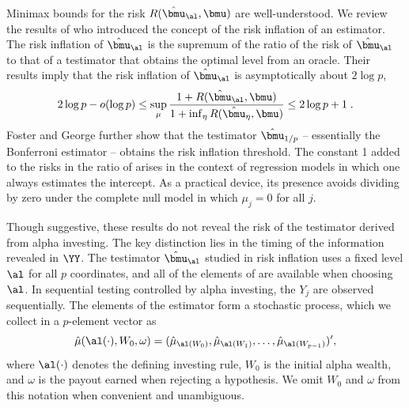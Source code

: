 \documentclass[12pt]{article}
\begin{document}
 Minimax bounds for the risk $R(\hat{\bmu}_\al,\bmu)$ are well-understood.  We
 review the results of \citet{fostergeorge94} who introduced the concept of the
 risk inflation of an estimator. \citep[][obtain similar results.]
  {donohojohnstone94} The risk inflation of $\hat{\bmu}_\al$ is the supremum of
 the ratio of the risk of $\hat{\bmu}_\al$ to that of a testimator that obtains
 the optimal level from an oracle.  Their results imply that the risk inflation
 of $\hat{\bmu}_\al$ is asymptotically about $2 \log p$,
 \begin{equation}
    2 \log p - o(\log p) 
    \le
    \sup_\mu  \frac{1 + R(\hat{\bmu}_\al,\bmu)}
                   {1 + \inf_\eta{R(\hat{\bmu}_\eta,\bmu)}}  
    \le 
    2 \log p + 1 \;.
 \label{eq:ri}
 \end{equation}
 Foster and George further show that the testimator $\hat{\bmu}_{1/p}$ --
 essentially the Bonferroni estimator -- obtains the risk inflation threshold.
  The constant 1 added to the risks in the ratio of  arises in the
 context of regression models in which one always estimates the intercept.  As a
 practical device, its presence avoids dividing by zero under the complete null
 model in which $\mu_j = 0$ for all $j$.


 Though suggestive, these results do not reveal the risk of the testimator
 derived from alpha investing.  The key distinction lies in the timing of the
 information revealed in $\YY$.  The testimator $\hat{\bmu}_\al$ studied in risk
 inflation uses a fixed level $\al$ for all $p$ coordinates, and all of the
 elements of \YY are available when choosing $\al$.  In sequential testing
 controlled by alpha investing, the $Y_j$ are observed sequentially.  The
 elements of the estimator form a stochastic process, which we collect in a
 $p$-element vector as
 \begin{equation}
   \hat\mu(\al(\cdot),W_0,\omega) = (\hat\mu_{\al(W_0)}, \hat\mu_{\al(W_1)}, \ldots, 
                       \hat\mu_{\al(W_{p-1})})',
 \label{eq:muHatAlphaInv}
 \end{equation}
 where $\al(\cdot)$ denotes the defining investing rule, $W_0$ is the initial
 alpha wealth, and $\omega$ is the payout earned when rejecting a hypothesis.
  We omit $W_0$ and $\omega$ from this notation when convenient and unambiguous.
 
\end{document}
